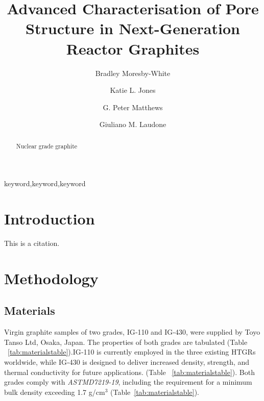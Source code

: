 \documentclass[3p,twocolumn]{elsarticle}
\begin{document}
\begin{frontmatter}
\title{Advanced Characterisation of Pore Structure in Next-Generation Reactor Graphites}
\author[plym]{Bradley Moresby-White}
\author[plym]{Katie L. Jones}
\author[plym]{G. Peter Matthews}
\author[plym]{Giuliano M. Laudone}
\address[plym]{Faculty of Science and Engineering, University of Plymouth, Plymouth, UK}
\begin{abstract}
Nuclear grade graphite
\end{abstract}
\begin{keyword}keyword\sep keyword\sep keyword\end{keyword}
\end{frontmatter}

\section{Introduction}
This is a citation.\cite{JONES2020256HgHe}

\section{Methodology}

\subsection{Materials}

Virgin graphite samples of two grades, IG‑110 and IG‑430, were supplied by Toyo
Tanso Ltd\texttrademark, Osaka, Japan. The properties of both grades are
tabulated (Table ~\ref{tab:materialstable}).IG‑110 is currently employed in the
three existing HTGRs worldwide, while IG‑430 is designed to deliver increased
density, strength, and thermal conductivity for future
applications.\citep{toyotanso_atomic_nuclear} (Table ~\ref{tab:materialstable}).
Both grades comply with \textit{ASTMD7219-19}, including the requirement for a
minimum bulk density exceeding 1.7 g/cm$^3$ \citep{ASTMD7219-19}
(Table~\ref{tab:materialstable}).

\begin{table*}
  \centering
  \caption{Manufacturer dataset for IG-110 and IG-430 \citep{Jones2018}}
  \label{tab:materialstable}
\end{table*}
\end{document}
